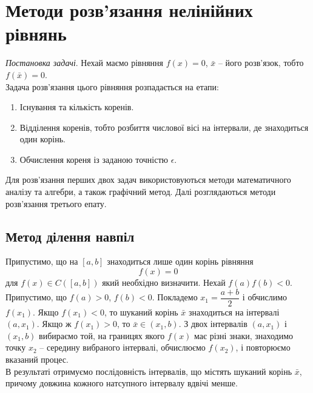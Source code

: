 


	\setcounter{section}{1}
	
	\section{Методи розв'язання нелінійних рівнянь}
	
	\textit{Постановка задачі}. Нехай маємо рівняння $f(x)=0$, $\bar x$ -- його розв'язок, тобто $f(\bar x)=0$.\\
	
	Задача розв'язання цього рівняння розпадається на етапи:
	\begin{enumerate}
		\item Існування та кількість коренів.
		\item Відділення коренів, тобто розбиття числової вісі на інтервали, де знаходиться один корінь.
		\item Обчислення кореня із заданою точністю $\epsilon$.
	\end{enumerate}

	Для розв'язання перших двох задач використовуються методи математичного аналізу та алгебри, а також графічний метод. Далі розглядаються методи розв'язання третього епату.
	
	\subsection{Метод ділення навпіл}
	Припустимо, що на $[a,b]$ знаходиться лише один корінь рівняння \begin{equation} \label{eq:f(x)=0} f(x)=0 \end{equation} для $f(x)\in C([a,b])$ який необхідно визначити. Нехай $f(a)f(b)<0$. Припустимо, що $f(a)>0$, $f(b)<0$. Покладемо $x_1=\dfrac{a+b}{2}$ і обчислимо $f(x_1)$. Якщо $f(x_1)<0$, то шуканий корінь $\bar x$ знаходиться на інтервалі $(a,x_1)$. Якщо ж $f(x_1)>0$, то $\bar x\in(x_1,b)$. З двох інтервалів $(a,x_1)$ і $(x_1,b)$ вибираємо той, на границях якого $f(x)$ має різні	 знаки, знаходимо точку $x_2$ -- середину вибраного інтервалі, обчислюємо $f(x_2)$, і повторюємо вказаний процес.\\
	
	В результаті отримуємо послідовність інтервалів, що містять шуканий корінь $\bar x$, причому довжина кожного натсупного інтервалу вдвічі менше.\\
	
